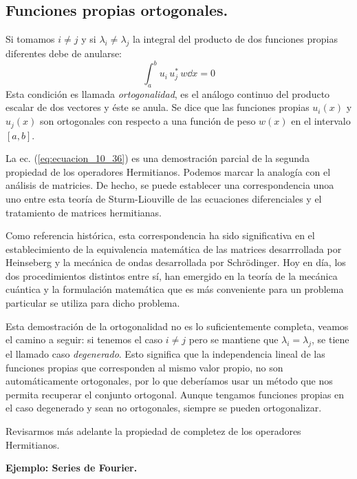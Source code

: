 \subsection{Funciones propias ortogonales.}
Si tomamos $i \neq	j$ y si $\lambda_{i} \neq \lambda_{j}$ la integral del producto de dos funciones propias diferentes debe de anularse:
\begin{equation}
\int_{a}^{b} u_{i} \, u_{j}^{*} \, w \dd{x} = 0
\label{eq:ecuacion_10_36}
\end{equation}
Esta condición es llamada \emph{ortogonalidad}, es el análogo continuo del producto escalar de dos vectores y éste se anula. Se dice que las funciones propias $u_{i}(x)$ y $u_{j}(x)$ son ortogonales con respecto a una función de peso $w(x)$ en el intervalo $[a,b]$.
\par
La ec. (\ref{eq:ecuacion_10_36}) es una demostración parcial de la segunda propiedad de los operadores Hermitianos. Podemos marcar la analogía con el análisis de matricies. De hecho, se puede establecer una correspondencia unoa uno entre esta teoría de Sturm-Liouville de las ecuaciones diferenciales y el tratamiento de matrices hermitianas.
\par
Como referencia histórica, esta correspondencia ha sido significativa en el establecimiento de la equivalencia matemática de las matrices desarrrollada por Heinseberg y la mecánica de ondas desarrollada por Schrödinger. Hoy en día, los dos procedimientos distintos entre sí, han emergido en la teoría de la mecánica cuántica y la formulación matemática que es más conveniente para un problema particular se utiliza para dicho problema.
\par
Esta demostración de la ortogonalidad no es lo suficientemente completa, veamos el camino a seguir: si tenemos el caso $i \neq j$ pero se mantiene que $\lambda_{i} = \lambda_{j}$, se tiene el llamado caso \emph{degenerado}. Esto significa que la independencia lineal de las funciones propias que corresponden al mismo valor propio, no son automáticamente ortogonales, por lo que deberíamos usar un método que nos permita recuperar el conjunto ortogonal.  Aunque tengamos funciones propias en el caso degenerado y sean no ortogonales, siempre se pueden ortogonalizar.
\par
Revisarmos más adelante la propiedad de completez de los operadores Hermitianos.
\par
\textbf{Ejemplo: Series de Fourier.}

